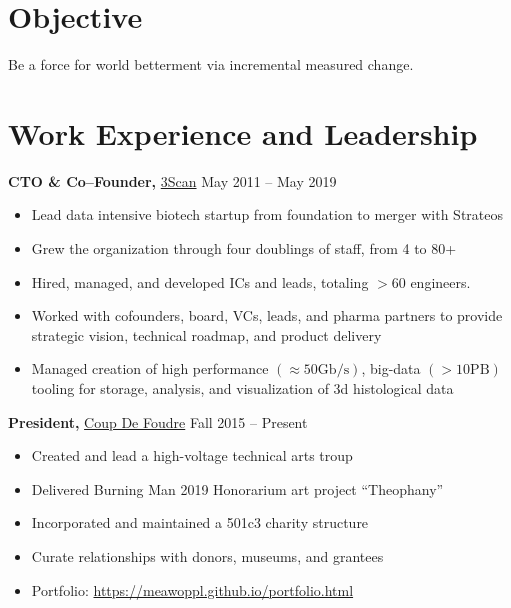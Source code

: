 \documentclass{res}
\begin{document}

\address{{\bf Home Address} \\ 166 Sanchez \#7 \\ San Francisco, CA 94114 \\
        (520) 591-5245 \\ meawoppl@gmail.com }
\address{{\bf Workshop Address} \\ 951 Hudson Ave \\ San Francisco, CA 94124 \\
        (562) 546-3326 \\ \href{https://meawoppl.github.io}{meawoppl.github.io}}

\begin{resume}

\section{Objective}
Be a force for world betterment via incremental measured change.

\section{Work Experience and Leadership}

{\bf CTO \& Co--Founder,} \href{http://www.3scan.com}{3Scan} \hfill
May 2011 -- May 2019
\begin{itemize}  \itemsep -2pt
  \item Lead data intensive biotech startup from foundation to merger with Strateos
  \item Grew the organization through four doublings of staff, from 4 to 80+
  \item Hired, managed, and developed ICs and leads, totaling $> 60$ engineers.
  \item Worked with cofounders, board, VCs, leads, and pharma partners to provide strategic vision,
    technical roadmap, and product delivery
  \item Managed creation of high performance $(\approx 50 \mathrm{Gb/s})$, big-data $(> 10\mathrm{PB})$ tooling for
    storage, analysis, and visualization of 3d histological data
\end{itemize}

{\bf President,}  \href{http://coupdefoud.re}{Coup De Foudre} \hfill   Fall 2015 -- Present
\begin{itemize} \itemsep -2pt
  \item Created and lead a high-voltage technical arts troup
  \item Delivered Burning Man 2019 Honorarium art project ``Theophany''
  \item Incorporated and maintained a 501c3 charity structure
  \item Curate relationships with donors, museums, and grantees
  \item Portfolio: \href{https://meawoppl.github.io/portfolio.html}{https://meawoppl.github.io/portfolio.html}
\end{itemize}


\end{resume}
\end{document}
